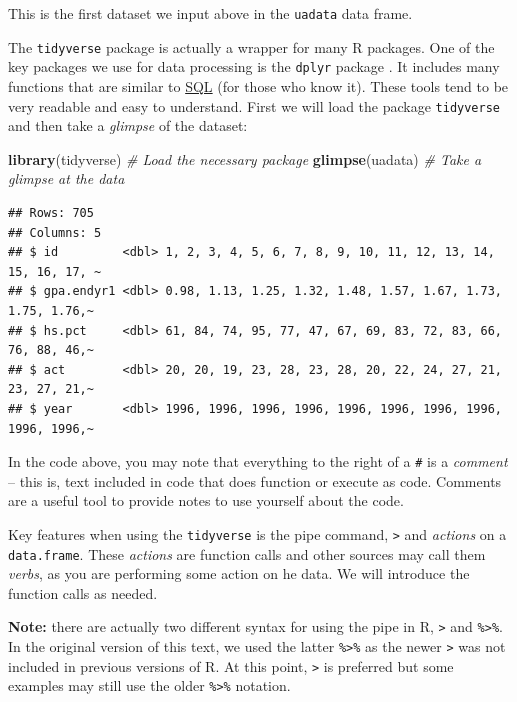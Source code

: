 \documentclass[
]{book}
\newenvironment{Shaded}{\begin{snugshade}}{\end{snugshade}}
\newcommand{\CommentTok}[1]{\textcolor[rgb]{0.56,0.35,0.01}{\textit{#1}}}
\newcommand{\FunctionTok}[1]{\textcolor[rgb]{0.13,0.29,0.53}{\textbf{#1}}}
\newcommand{\NormalTok}[1]{#1}
\begin{document}
This is the first dataset we input above in the \texttt{uadata} data frame.

The \texttt{tidyverse} package \citep{R-tidyverse} is actually a wrapper for many R packages. One of the key packages we use for data processing is the \texttt{dplyr} package \citep{R-dplyr}. It includes many functions that are similar to \href{https://www.tutorialspoint.com/sql/sql-overview.htm}{SQL} (for those who know it). These tools tend to be very readable and easy to understand. First we will load the package \texttt{tidyverse} and then take a \emph{glimpse} of the dataset:

\begin{Shaded}
\begin{Highlighting}[]
\FunctionTok{library}\NormalTok{(tidyverse)   }\CommentTok{\# Load the necessary package}
\FunctionTok{glimpse}\NormalTok{(uadata)      }\CommentTok{\# Take a glimpse at the data}
\end{Highlighting}
\end{Shaded}

\begin{verbatim}
## Rows: 705
## Columns: 5
## $ id         <dbl> 1, 2, 3, 4, 5, 6, 7, 8, 9, 10, 11, 12, 13, 14, 15, 16, 17, ~
## $ gpa.endyr1 <dbl> 0.98, 1.13, 1.25, 1.32, 1.48, 1.57, 1.67, 1.73, 1.75, 1.76,~
## $ hs.pct     <dbl> 61, 84, 74, 95, 77, 47, 67, 69, 83, 72, 83, 66, 76, 88, 46,~
## $ act        <dbl> 20, 20, 19, 23, 28, 23, 28, 20, 22, 24, 27, 21, 23, 27, 21,~
## $ year       <dbl> 1996, 1996, 1996, 1996, 1996, 1996, 1996, 1996, 1996, 1996,~
\end{verbatim}

In the code above, you may note that everything to the right of a \texttt{\#} is a \emph{comment} -- this is, text included in code that does function or execute as code. Comments are a useful tool to provide notes to use yourself about the code.

Key features when using the \texttt{tidyverse} is the pipe command, \texttt{\textbar{}\textgreater{}} and \emph{actions} on a \texttt{data.frame}. These \emph{actions} are function calls and other sources may call them \emph{verbs}, as you are performing some action on he data. We will introduce the function calls as needed.

\textbf{Note:} there are actually two different syntax for using the pipe in R, \texttt{\textbar{}\textgreater{}} and \texttt{\%\textgreater{}\%}. In the original version of this text, we used the latter \texttt{\%\textgreater{}\%} as the newer \texttt{\textbar{}\textgreater{}} was not included in previous versions of R. At this point, \texttt{\textbar{}\textgreater{}} is preferred but some examples may still use the older \texttt{\%\textgreater{}\%} notation.
\end{document}
